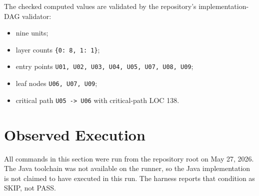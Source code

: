 \documentclass[11pt,letterpaper]{article}
\begin{document}
The checked computed values are validated by the repository's
implementation-DAG validator:

\begin{itemize}
  \item nine units;
  \item layer counts \texttt{\{0: 8, 1: 1\}};
  \item entry points \texttt{U01, U02, U03, U04, U05, U07, U08, U09};
  \item leaf nodes \texttt{U06, U07, U09};
  \item critical path \texttt{U05 -> U06} with critical-path LOC 138.
\end{itemize}

\section{Observed Execution}

All commands in this section were run from the repository root on
May 27, 2026. The Java toolchain was not available on the runner, so
the Java implementation is not claimed to have executed in this run.
The harness reports that condition as SKIP, not PASS.
\end{document}
